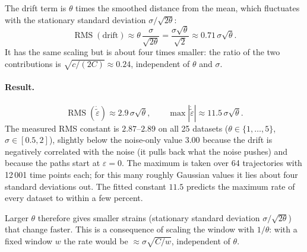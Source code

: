 \documentclass[11pt]{article}
\begin{document}
The drift term is $\theta$ times the smoothed distance from the mean, which
fluctuates with the stationary standard deviation $\sigma/\sqrt{2\theta}$:
\begin{equation}
    \operatorname{RMS}(\text{drift}) \approx \theta\,\frac{\sigma}{\sqrt{2\theta}}
    = \frac{\sigma\sqrt{\theta}}{\sqrt{2}} \approx 0.71\,\sigma\sqrt{\theta}.
\end{equation}
It has the same scaling but is about four times smaller: the ratio of the two
contributions is $\sqrt{c/(2C)}\approx 0.24$, independent of $\theta$ and
$\sigma$.

\paragraph{Result.}
\begin{equation}
    \operatorname{RMS}(\dot{\tilde\varepsilon}) \approx 2.9\,\sigma\sqrt{\theta},
    \qquad
    \max|\dot{\tilde\varepsilon}| \approx 11.5\,\sigma\sqrt{\theta}.
    \label{eq:strain-rate-ou}
\end{equation}
The measured RMS constant is $2.87$--$2.89$ on all 25 datasets
($\theta\in\{1,\dots,5\}$, $\sigma\in[0.5,2]$), slightly below the noise-only
value $3.00$ because the drift is negatively correlated with the noise (it
pulls back what the noise pushes) and because the paths start at
$\varepsilon=0$. The maximum is taken over 64 trajectories with 12\,001
time points each; for this many roughly Gaussian values it lies about four
standard deviations out. The fitted constant $11.5$ predicts the maximum
rate of every dataset to within a few percent.

Larger $\theta$ therefore gives smaller strains (stationary standard
deviation $\sigma/\sqrt{2\theta}$) that change faster. This is a consequence
of scaling the window with $1/\theta$: with a fixed window $w$ the rate would
be $\approx\sigma\sqrt{C/w}$, independent of $\theta$.
\end{document}
